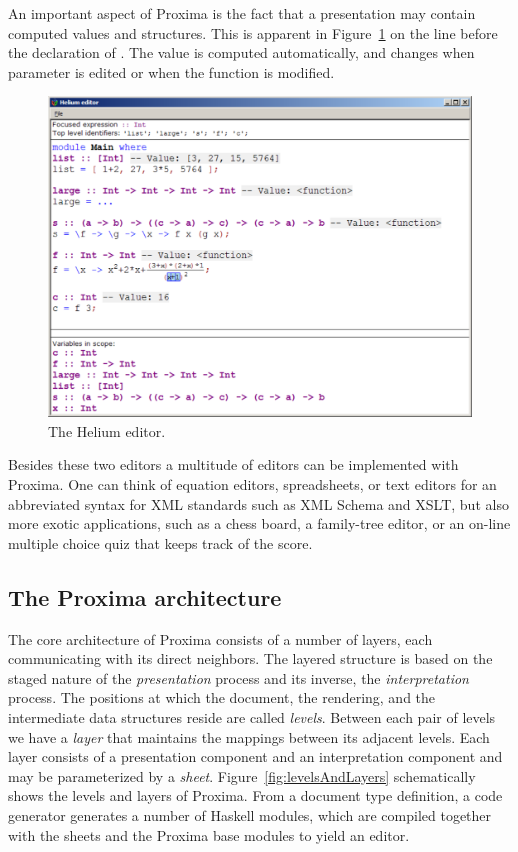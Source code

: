 \documentclass[10pt]{article}
\begin{document}
An important aspect of Proxima is the fact that a presentation may contain computed values and structures. This is apparent in Figure~\ref{fig:heliumEditor} on the line before the declaration of . The value  is computed automatically, and changes when parameter  is edited or when the function  is modified.

\begin{figure}
\begin{center}
\includegraphics[width=12cm]{images/heliumMainWindow}
\end{center}
\caption{The Helium editor.}
\label{fig:heliumEditor}
\end{figure}

Besides these two editors a multitude of editors can be implemented with Proxima. One can think of equation editors, spreadsheets, or text editors for an abbreviated syntax for XML standards such as XML Schema and XSLT, but also more exotic applications, such as a chess board, a family-tree editor, or an on-line multiple choice quiz that keeps track of the score.


\subsection{The Proxima architecture}

The core architecture of Proxima consists of a number of layers, each communicating with its direct neighbors. The layered structure is based on the staged nature of the {\em presentation} process and its inverse, the {\em interpretation} process. The positions at which the document, the rendering, and the intermediate data structures reside are called {\em levels}. Between each pair of levels we have a {\em layer} that maintains the mappings between its adjacent levels. Each layer consists of a presentation component and an interpretation component and may be parameterized by a {\em sheet}. Figure~\ref{fig:levelsAndLayers} schematically shows the levels and layers of Proxima. From a document type definition, a code generator generates a number of Haskell modules, which are compiled together with the sheets and the Proxima base modules to yield an editor. 
\end{document}

